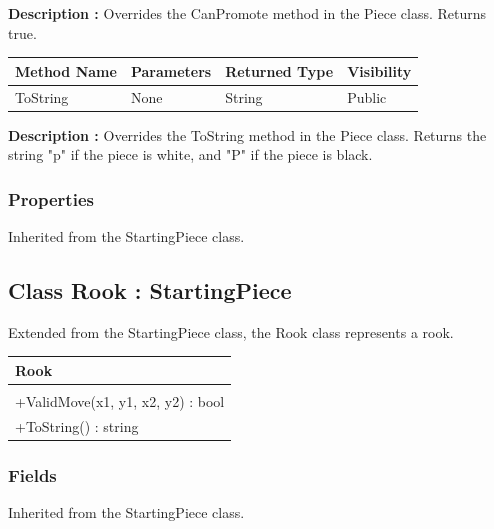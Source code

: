 \documentclass[12pt]{article}
\begin{document}
    \textbf{Description :} Overrides the CanPromote method in the Piece class.
    Returns true. 

\begin{table}[H]
    \begin{tabular}{|l|l|l|l|}
    \hline
    \rowcolor[HTML]{EFEFEF} 
    \cellcolor[HTML]{EFEFEF}\textbf{Method Name} & \textbf{Parameters}  & \textbf{Returned Type} & \textbf{Visibility} \\ \hline
    ToString                                   & None                 & String                   & Public              \\ \hline
    \end{tabular}
\end{table}

    \textbf{Description :} Overrides the ToString method in the Piece class.
    Returns the string "p" if the piece is white, and "P" if the piece is black. 

\subsubsection{Properties}

    Inherited from the StartingPiece class.
\newpage


\subsection{Class Rook : StartingPiece}

    Extended from the StartingPiece class, the Rook class represents a rook.
\begin{table}[H]
    \begin{tabular}{|l|}
    \hline
    \cellcolor[HTML]{C0C0C0}\textbf{Rook} \\ \hline
    \cellcolor[HTML]{EFEFEF}                    \\ \hline
    +ValidMove(x1, y1, x2, y2) : bool           \\ \hline
    +ToString() : string                        \\ \hline
    \end{tabular}
\end{table}

\subsubsection{Fields}

    Inherited from the StartingPiece class.
\end{document}
